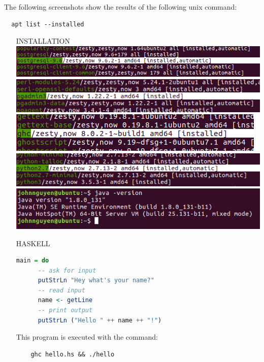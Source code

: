 \documentclass[12pt]{report}
\begin{document}
The following screenshots show the results of the following unix command:
\begin{verbatim}
  apt list --installed
\end{verbatim}
\begin{enumerate}
  \item [INSTALLATION]
  \includegraphics[scale = 0.5]{postgres}\\
  \includegraphics[scale = 0.5]{pgadmin}\\
  \includegraphics[scale = 0.5]{haskell}\\
  \includegraphics[scale = 0.5]{python}\\
  \includegraphics[scale = 0.5]{java}\\

  \item [HASKELL]
  \begin{lstlisting}[language = Haskell]
    main = do
      -- ask for input
      putStrLn "Hey what's your name?"
      -- read input
      name <- getLine
      -- print output
      putStrLn ("Hello " ++ name ++ "!")
  \end{lstlisting}

  This program is executed with the command:
  \begin{verbatim}
    ghc hello.hs && ./hello
  \end{verbatim}
  \vspace{1.5cm}


\end{enumerate}
\end{document}
